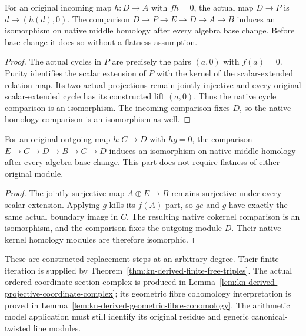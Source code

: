 \begin{lemma}
\label{lem:kn-derived-free-replacement-lower}
\leanok
For an original incoming map $h:D\to A$ with $fh=0$, the actual
map $D\to P$ is $d\mapsto(h(d),0)$.  The comparison
$D\to P\to E\longrightarrow D\to A\to B$ induces an
isomorphism on native middle homology after every algebra base change.
Before base change it does so without a flatness assumption.
\end{lemma}
\begin{proof}
The actual cycles in $P$ are precisely the pairs $(a,0)$ with $f(a)=0$.
Purity identifies the scalar extension of $P$ with the kernel of the
scalar-extended relation map.  Its two actual projections remain
jointly injective and every original scalar-extended cycle has its
constructed lift $(a,0)$.  Thus the native cycle comparison is an
isomorphism.  The incoming comparison fixes $D$, so the native
homology comparison is an isomorphism as well.
\end{proof}

\begin{lemma}
\label{lem:kn-derived-free-replacement-upper}
\leanok
For an original outgoing map $h:C\to D$ with $hg=0$, the comparison
$E\to C\to D\longrightarrow B\to C\to D$ induces an isomorphism
on native middle homology after every algebra base change.  This part
does not require flatness of either original module.
\end{lemma}
\begin{proof}
The jointly surjective map $A\oplus E\to B$ remains surjective
under every scalar extension.  Applying $g$ kills its $f(A)$ part,
so $ge$ and $g$ have exactly the same actual boundary image in $C$.
The resulting native cokernel comparison is an isomorphism, and
the comparison fixes the outgoing module $D$.  Their native kernel
homology modules are therefore isomorphic.
\end{proof}

\begin{remark}
\label{rmk:kn-derived-replacement-scope}
These are constructed replacement steps at an arbitrary degree.
Their finite iteration is supplied by
Theorem~\ref{thm:kn-derived-finite-free-triples}.  The actual ordered
coordinate section complex is produced in
Lemma~\ref{lem:kn-derived-projective-coordinate-complex}; its
geometric fibre cohomology interpretation is proved in
Lemma~\ref{lem:kn-derived-geometric-fibre-cohomology}.  The arithmetic
model application must still identify its original residue and
generic canonical-twisted line modules.
\end{remark}
